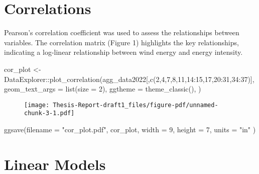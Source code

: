 \documentclass[
]{report}
\newenvironment{Shaded}{\begin{snugshade}}{\end{snugshade}}
\newcommand{\AttributeTok}[1]{\textcolor[rgb]{0.40,0.45,0.13}{#1}}
\newcommand{\DecValTok}[1]{\textcolor[rgb]{0.68,0.00,0.00}{#1}}
\newcommand{\FunctionTok}[1]{\textcolor[rgb]{0.28,0.35,0.67}{#1}}
\newcommand{\NormalTok}[1]{\textcolor[rgb]{0.00,0.23,0.31}{#1}}
\newcommand{\OtherTok}[1]{\textcolor[rgb]{0.00,0.23,0.31}{#1}}
\newcommand{\SpecialCharTok}[1]{\textcolor[rgb]{0.37,0.37,0.37}{#1}}
\newcommand{\StringTok}[1]{\textcolor[rgb]{0.13,0.47,0.30}{#1}}
\begin{document}
\hypertarget{correlations}{%
\section{Correlations}\label{correlations}}

Pearson's correlation coefficient was used to assess the relationships
between variables. The correlation matrix (Figure 1) highlights the key
relationships, indicating a log-linear relationship between wind energy
and energy intensity.

\begin{Shaded}
\begin{Highlighting}[]
\NormalTok{cor\_plot }\OtherTok{\textless{}{-}}\NormalTok{ DataExplorer}\SpecialCharTok{::}\FunctionTok{plot\_correlation}\NormalTok{(agg\_data2022[,}\FunctionTok{c}\NormalTok{(}\DecValTok{2}\NormalTok{,}\DecValTok{4}\NormalTok{,}\DecValTok{7}\NormalTok{,}\DecValTok{8}\NormalTok{,}\DecValTok{11}\NormalTok{,}\DecValTok{14}\SpecialCharTok{:}\DecValTok{15}\NormalTok{,}\DecValTok{17}\NormalTok{,}\DecValTok{20}\SpecialCharTok{:}\DecValTok{31}\NormalTok{,}\DecValTok{34}\SpecialCharTok{:}\DecValTok{37}\NormalTok{)], }
                               \AttributeTok{geom\_text\_args =} \FunctionTok{list}\NormalTok{(}\AttributeTok{size =} \DecValTok{2}\NormalTok{), }
                               \AttributeTok{ggtheme =} \FunctionTok{theme\_classic}\NormalTok{(), }
\NormalTok{                               )}
\end{Highlighting}
\end{Shaded}

\begin{figure}[H]

{\centering \texttt{[image: Thesis-Report-draft1\_files/figure-pdf/unnamed-chunk-3-1.pdf]}

}

\end{figure}

\begin{Shaded}
\begin{Highlighting}[]
\FunctionTok{ggsave}\NormalTok{(}\AttributeTok{filename =} \StringTok{"cor\_plot.pdf"}\NormalTok{, cor\_plot, }\AttributeTok{width =} \DecValTok{9}\NormalTok{, }\AttributeTok{height =} \DecValTok{7}\NormalTok{, }\AttributeTok{units =} \StringTok{"in"}\NormalTok{ )}
\end{Highlighting}
\end{Shaded}

\hypertarget{linear-models}{%
\section{Linear Models}\label{linear-models}}
\end{document}
